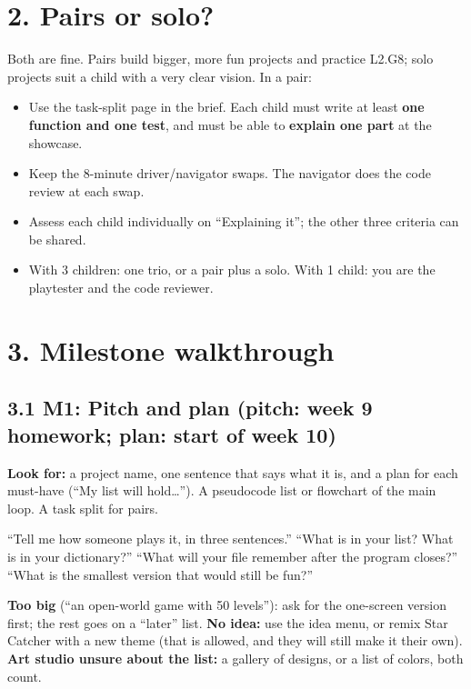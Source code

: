 \documentclass[level=2,teacher]{kidscode}
\begin{document}
\section{2. Pairs or solo?}
Both are fine. Pairs build bigger, more fun projects and practice L2.G8; solo projects suit a
child with a very clear vision. In a pair:
\begin{itemize}[itemsep=1pt]
  \item Use the task-split page in the brief. Each child must write at least \textbf{one function
        and one test}, and must be able to \textbf{explain one part} at the showcase.
  \item Keep the 8-minute driver/navigator swaps. The navigator does the code review at each swap.
  \item Assess each child individually on \enquote{Explaining it}; the other three criteria can be shared.
  \item With 3 children: one trio, or a pair plus a solo. With 1 child: you are the playtester and
        the code reviewer.
\end{itemize}

\section{3. Milestone walkthrough}

\subsection{3.1 M1: Pitch and plan (pitch: week 9 homework; plan: start of week 10)}
\textbf{Look for:} a project name, one sentence that says what it is, and a plan for each must-have
(\enquote{My list will hold\ldots}). A pseudocode list or flowchart of the main loop. A task split for pairs.

\begin{teacherscript}
\enquote{Tell me how someone plays it, in three sentences.} \enquote{What is in your list? What is in your
dictionary?} \enquote{What will your file remember after the program closes?} \enquote{What is the
smallest version that would still be fun?}
\end{teacherscript}

\begin{tip}[Unblocking]
\textbf{Too big} (\enquote{an open-world game with 50 levels}): ask for the one-screen version first;
the rest goes on a \enquote{later} list. \textbf{No idea:} use the idea menu, or remix Star Catcher with a
new theme (that is allowed, and they will still make it their own). \textbf{Art studio unsure about the
list:} a gallery of designs, or a list of colors, both count.
\end{tip}
\end{document}
